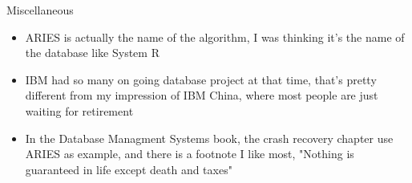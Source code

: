 \documentclass[12pt,a4paper,oneside]{article}
\begin{document}
Miscellaneous

\begin{itemize}
  \item ARIES is actually the name of the algorithm, I was thinking it's the name of the database
like System R
  \item IBM had so many on going database project at that time, that's pretty different from my
impression of IBM China, where most people are just waiting for retirement
  \item In the Database Managment Systems book, the crash recovery chapter use ARIES as example,
and there is a footnote I like most, "Nothing is guaranteed in life except death and taxes"
\end{itemize}
\end{document}
